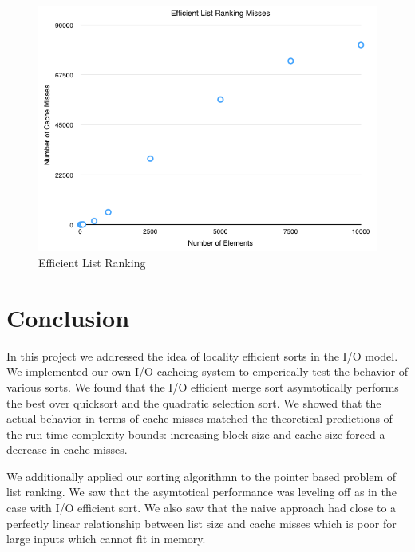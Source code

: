\documentclass[11pt]{article}
\begin{document}
\begin{figure}[H]  
\includegraphics[scale=0.5]{figures/EfficientListRanking.png}
\caption{Efficient List Ranking}
\label{efficientlistranking}
\end{figure}

\section{Conclusion}
In this project we addressed the idea of locality efficient sorts in the I/O model.  We implemented our own I/O cacheing system to 
emperically test the behavior of various sorts.   We found that the I/O efficient merge sort asymtotically performs the best over quicksort 
and the quadratic selection sort.  We showed that the actual behavior in terms of cache misses matched the theoretical predictions of the 
run time complexity bounds: increasing block size and cache size forced a decrease in cache misses.

We additionally applied our sorting algorithmn to the pointer based problem of list ranking.  We saw that 
the asymtotical performance was leveling off as in the case with I/O efficient sort.  We also saw that the naive approach had close to a 
perfectly linear relationship between list size and cache misses which is poor for large inputs which cannot fit in memory.
\end{document}

